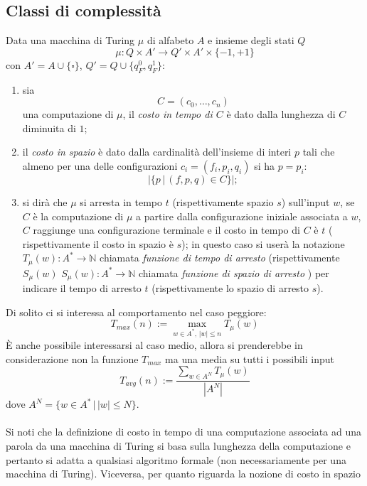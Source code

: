 

\subsection{Classi di complessità}
\begin{defi}
    Data una macchina di Turing $\mu$ di alfabeto $A$ e insieme degli stati $Q$
    \[
    \mu: 
    Q\times  A' 
    \to Q' 
    \times 
    A' 
    \times 
    \{-1,+1\}
    \]
    con $A'=A \cup \{ \square\}$, $Q'=Q \cup \{ q_F^0, q_F^1\}$:
    \begin{enumerate}
        \item  sia
\[
C = (c_0,\dots,c_n)
\]
una computazione di $\mu$, il \textit{costo in tempo di $C$} è dato dalla lunghezza di $C$ diminuita di $1$;

\item il \textit{costo in spazio} è dato dalla cardinalità dell’insieme di interi $p$ tali che almeno per una delle configurazioni $c_i = (f_i,p_i,q_i)$ si ha $p= p_i$:
\[
|\{
p \, | \, (f,p,q) \in C
\}|;
\]

\item  si dirà che $\mu$ si arresta in tempo $t$ (rispettivamente spazio $s$) sull’input $w$, se $C$ è la computazione di
$\mu$ a partire dalla configurazione iniziale associata a $w$, $C$ raggiunge una configurazione terminale e il
costo in tempo di $C$ è $t$ ( rispettivamente il costo in spazio è $s$); in questo caso si userà la notazione
$T_\mu(w):A^* \to \mathbb N$ chiamata
\textit{funzione di tempo di arresto} 
(rispettivamente $S_\mu(w)$
$S_\mu(w):A^* \to \mathbb N$ chiamata
\textit{funzione di spazio di arresto} 
) per indicare il tempo di arresto $t$ (rispettivamente lo spazio di arresto
$s$).
    \end{enumerate}
\end{defi}
Di solito ci si interessa al comportamento nel caso peggiore:
\[
T_{max}(n)
:=
\operatorname{max}_{w\in A^*, \,|w|\leq n}T_\mu(w)
\]
È anche possibile interessarsi al caso medio, allora si prenderebbe in considerazione non la funzione $T_{max}$
ma una media su tutti i possibili input
\[
T_{avg} (n) :=
\frac{\sum_{w\in A^N}T_\mu(w)}{|A^N|}
\]
dove $A^N=\{ w\in A^* \,  |  \, |w| \leq N\}$.
\\ \\
Si noti che la definizione di costo in tempo di una computazione associata ad una parola da una macchina
di Turing si basa sulla lunghezza della computazione e pertanto si adatta a qualsiasi algoritmo formale (non
necessariamente per una macchina di Turing). Viceversa, per quanto riguarda la nozione di costo in spazio
